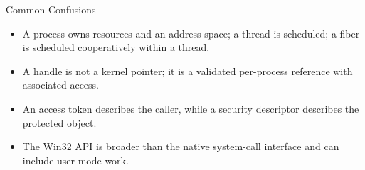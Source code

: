 \documentclass[10pt,letterpaper]{article}
\begin{document}
\begin{studybox}{Common Confusions}
\begin{itemize}
  \item A process owns resources and an address space; a thread is scheduled; a fiber is scheduled cooperatively within a thread.
  \item A handle is not a kernel pointer; it is a validated per-process reference with associated access.
  \item An access token describes the caller, while a security descriptor describes the protected object.
  \item The Win32 API is broader than the native system-call interface and can include user-mode work.
\end{itemize}
\end{studybox}
\end{document}
